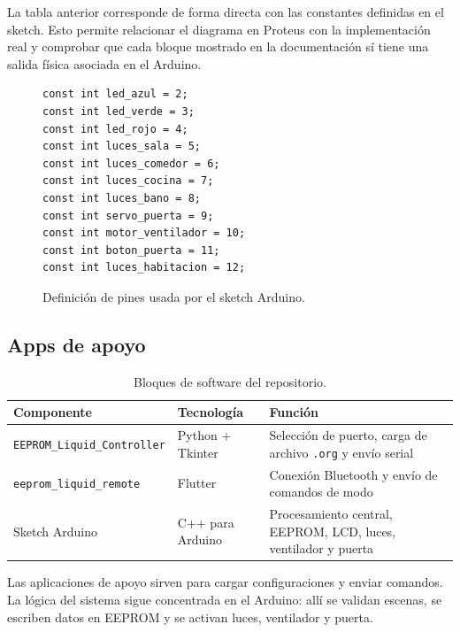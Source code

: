 \documentclass[12pt,a4paper]{article}
\begin{document}
La tabla anterior corresponde de forma directa con las constantes definidas en el sketch. Esto permite relacionar el diagrama en Proteus con la implementación real y comprobar que cada bloque mostrado en la documentación sí tiene una salida física asociada en el Arduino.

\begin{figure}[H]
    \centering
    \begin{minipage}{0.9\textwidth}
        \begin{lstlisting}[basicstyle=\ttfamily\footnotesize]
const int led_azul = 2;
const int led_verde = 3;
const int led_rojo = 4;
const int luces_sala = 5;
const int luces_comedor = 6;
const int luces_cocina = 7;
const int luces_bano = 8;
const int servo_puerta = 9;
const int motor_ventilador = 10;
const int boton_puerta = 11;
const int luces_habitacion = 12;
        \end{lstlisting}
    \end{minipage}
    \caption{Definición de pines usada por el sketch Arduino.}
\end{figure}

\subsection{Apps de apoyo}
\begin{table}[H]
    \centering
    \caption{Bloques de software del repositorio.}
    \small
    \begin{tabular}{>{\raggedright\arraybackslash}p{3.5cm} >{\raggedright\arraybackslash}p{3.3cm} >{\raggedright\arraybackslash}p{6.4cm}}
        \toprule
        \textbf{Componente} & \textbf{Tecnología} & \textbf{Función} \\
        \midrule
        \texttt{EEPROM\_Liquid\_\newline Controller} & Python + Tkinter & Selección de puerto, carga de archivo \texttt{.org} y envío serial \\
        \texttt{eeprom\_liquid\_remote} & Flutter & Conexión Bluetooth y envío de comandos de modo \\
        Sketch Arduino & C++ para Arduino & Procesamiento central, EEPROM, LCD, luces, ventilador y puerta \\
        \bottomrule
    \end{tabular}
\end{table}

Las aplicaciones de apoyo sirven para cargar configuraciones y enviar comandos. La lógica del sistema sigue concentrada en el Arduino: allí se validan escenas, se escriben datos en EEPROM y se activan luces, ventilador y puerta.
\end{document}

